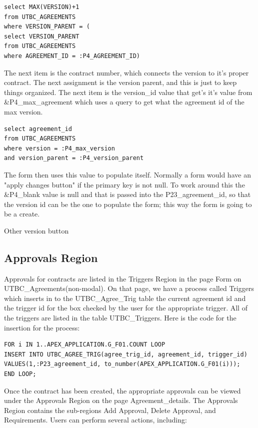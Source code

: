 \documentclass{report}
\begin{document}
\begin{lstlisting}[caption=P4\_NEXT\_value query]
select MAX(VERSION)+1 
from UTBC_AGREEMENTS 
where VERSION_PARENT = (
select VERSION_PARENT 
from UTBC_AGREEMENTS 
where AGREEMENT_ID = :P4_AGREEMENT_ID)
\end{lstlisting}

The next item is the contract number, which connects the version to it's proper contract. The next assignment is the version parent, and this is just to keep things organized. The next item is the version\_id value that get's it's value from \&P4\_max\_agreement which uses a query to get what the agreement id of the max version. 

\begin{lstlisting}[caption=P4\_max\_agreement query]
select agreement_id 
from UTBC_AGREEMENTS 
where version = :P4_max_version 
and version_parent = :P4_version_parent
\end{lstlisting}

The form then uses this value to populate itself. Normally a form would have an "apply changes button" if the primary key is not null. To work around this the \&P4\_blank value is null and that is passed into the P23\_agreement\_id, so that the version id can be the one to populate the form; this way the form is going to be a create. 

Other version button

\subsection{Approvals Region}
Approvals for contracts are listed in the Triggers Region in the page Form on UTBC\_Agreements(non-modal).   On that page, we have a process called Triggers which inserts in to the UTBC\_Agree\_Trig table the current agreement id and the trigger id for the box checked by the user for the appropriate trigger.  All of the triggers are listed in the table UTBC\_Triggers.  
Here is the code for the insertion for the process:

\begin{lstlisting}
FOR i IN 1..APEX_APPLICATION.G_F01.COUNT LOOP
INSERT INTO UTBC_AGREE_TRIG(agree_trig_id, agreement_id, trigger_id)  
VALUES(1,:P23_agreement_id, to_number(APEX_APPLICATION.G_F01(i)));
END LOOP;
\end{lstlisting}

Once the contract has been created, the appropriate approvals can be viewed under the Approvals Region on the page Agreement\_details.  The Approvals Region contains the sub-regions Add Approval, Delete Approval, and Requirements.  Users can perform several actions, including: 
\end{document}
